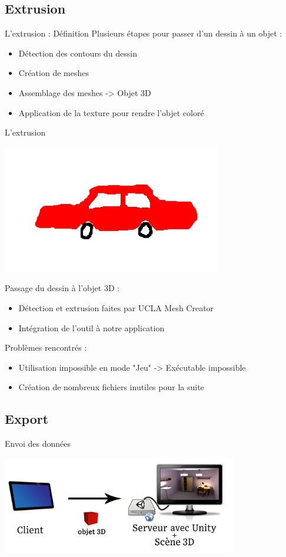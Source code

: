 \documentclass[a4paper,10pt]{beamer}
\begin{document}
	\subsection{Extrusion}
	\begin{frame}{L'extrusion : Définition}
		Plusieurs étapes pour passer d'un dessin à un objet :
		\begin{itemize}
			\item Détection des contours du dessin
			\item Création de meshes
			\item Assemblage des meshes -> Objet 3D
			\item Application de la texture pour rendre l'objet coloré
		\end{itemize}
	
	\end{frame}
		
	\begin{frame}{L'extrusion}
		\centerline{\includegraphics[scale=0.3]{images/techno/voiture.png}}
		Passage du dessin à l'objet 3D :
		\begin{itemize}
			\item Détection et extrusion faites par UCLA Mesh Creator
			\item Intégration de l'outil à notre application
		\end{itemize}
		\medbreak
		Problèmes rencontrés :
		\begin{itemize}
			\item Utilisation impossible en mode "Jeu" -> Exécutable impossible
			\item Création de nombreux fichiers inutiles pour la suite
		\end{itemize}
	\end{frame}
	\subsection{Export}
	\begin{frame}{Envoi des données}
		\centerline{\includegraphics[height=120pt]{images/network/sending_model2.png}}
	\end{frame}
	
\end{document}
